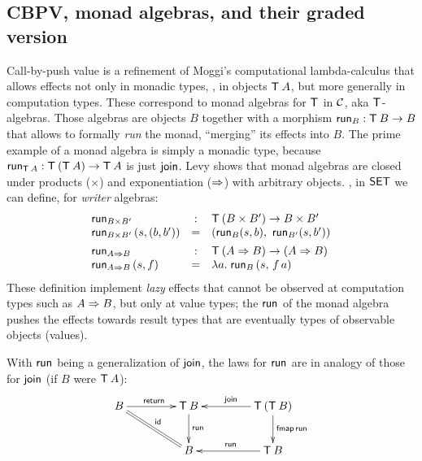 \documentclass[acmsmall,review,anonymous]{acmart}\settopmatter{printfolios=true,printccs=false,printacmref=false}
\theoremstyle{remark}
\begin{document}
\subsection{CBPV, monad algebras, and their graded version}
\label{sec:graded_algebra}

Call-by-push value \cite{levy:hosc06} is a refinement of Moggi's
computational lambda-calculus \cite{moggi:infcomp91} that allows effects
not only in monadic types, \ie, in objects $\T\,A$, but more generally
in computation types.  These correspond to monad algebras for $\T$ in $\CC$,
aka $\T$-algebras.
Those algebras are objects $B$ together with a morphism $\run[B] : \T\,B
\to B$ that allows to formally \emph{run} the monad, ``merging'' its
effects into $B$.
The prime example of a monad algebra is simply a monadic
type, because $\run[\T\,A] : \T\,(\T\,A) \to \T\,A$ is just
$\tjoin$.  Levy \citeyearpar{levy:hosc06} shows that monad algebras are
closed under products ($\times$) and exponentiation ($\To$)
with arbitrary objects.  \Eg,
in $\SET$ we can define, for \emph{writer} algebras:
\[
\begin{array}{lcl}
  \run[B \times B'] & : & \T\,(B \times B') \to B \times B' \\
  \run[B \times B']\, (s,(b,b')) & = & (\run[B] (s,b),\
                                           \run[B'] (s,b'))
\\[1ex]
  \run[A \To B] & : & \T\,(A \To B) \to (A \To B) \\
  \run[A \To B]\, (s,f) & = & \lambda a.\; \run[B]\,(s,\,f\,a)
\\
\end{array}
\]
These definition implement \emph{lazy} effects that cannot be observed
at computation types such as $A \To B$, but only at value types; the
$\run[]$ of the monad algebra pushes the effects towards result types
that are eventually types of observable objects (values).

With $\run[]$ being a generalization of $\tjoin$, the laws for $\run[]$
are in analogy of those for $\tjoin$ (if $B$ were $\T\,A$):
\[
\xymatrix@C=10ex{
  B     \ar[r]^{\treturn} \ar@{=}[dr]^{\tid}
& \T\,B \ar[d]^{\run[]}
& \T\,(\T\,B) \ar[l]_{\tjoin} \ar[d]^{\tfmap\,\run[]}
\\
& B
& \T\,B \ar[l]_{\run[]}
}
\]
\end{document}
